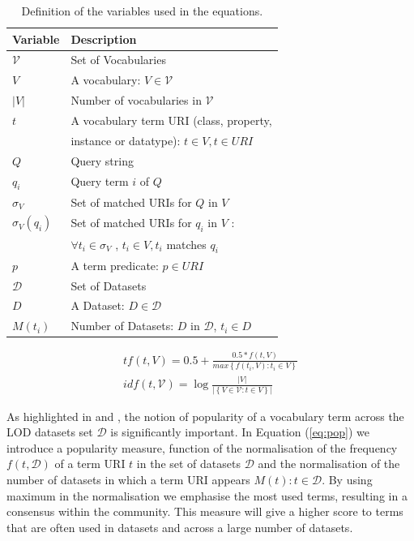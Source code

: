 \documentclass{iosart2c}
\begin{document}
\begin{table}[h!tb]
\caption{Definition of the variables used in the equations.}
\label{tab:variable}
\begin{tabular}{|l|l|}
  \hline
  \textbf{Variable} & \textbf{Description} \\ \hline
  $\mathcal{V}$ & Set of Vocabularies \\ \hline
  $V$ & A vocabulary: $V \in \mathcal{V}$ \\ \hline
  $|V|$ & Number of vocabularies in $\mathcal{V}$ \\ \hline
  $t$ & A vocabulary term URI (class, property, \\
       &  instance or datatype): $t \in V, t \in URI$ \\ \hline
  $Q$ & Query string \\ \hline
  $q_i$ & Query term $i$ of $Q$ \\ \hline
  $\sigma_V$ & Set of matched URIs for $Q$ in $V$ \\ \hline
  $\sigma_V(q_i)$ & Set of matched URIs for $q_i$ in $V$ : \\
         & $\forall t_i \in \sigma_V$ , $t_i \in V ,  t_i$ matches $q_i$ \\ \hline
  $p$ & A term predicate: $p \in URI$ \\ \hline
  $\mathcal{D}$ & Set of Datasets \\ \hline
  $D$ & A Dataset: $D \in \mathcal{D}$ \\ \hline
  $M(t_i)$ & Number of Datasets: $D$ in $\mathcal{D}$, $t_i \in D$ \\ \hline
\end{tabular}
\end{table}

\begin{equation}\label{eq:tfidf}
\begin{split}
tf(t,V) =0.5+ \frac{0.5 * f(t,V)}{max\left\{f(t_i,V): t_i \in V\right\}} \\
idf(t,\mathcal{V}) =\log\frac{|V|}{|\left\{V \in \mathcal{V}: t \in V\right\}|}
\end{split}
\end{equation}
 

As highlighted in \cite{butt2014} and \cite{schaible2013lover}, the notion of popularity of a vocabulary term across the LOD datasets set $\mathcal{D}$ is significantly important. In Equation (\ref{eq:pop}) we introduce a popularity measure, function of the normalisation of the frequency $f(t,\mathcal{D})$ of a term URI $t$ in the set of datasets $\mathcal{D}$ and the normalisation of the number of datasets in which a term URI appears $M(t): t \in \mathcal{D}$. By using maximum in the normalisation we emphasise the most used terms, resulting in a consensus within the community. This measure will give a higher score to terms that are often used in datasets and across a large number of datasets.
\end{document}
